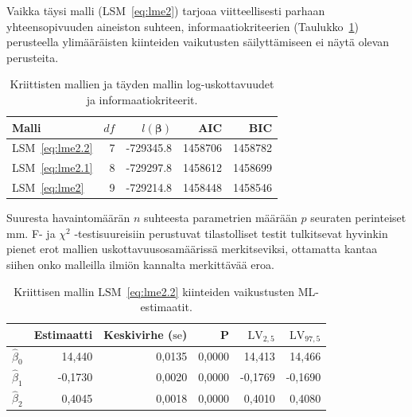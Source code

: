\documentclass[finnish]{docopts}
\begin{document}
Vaikka täysi malli (LSM~\ref{eq:lme2}) tarjoaa viitteellisesti parhaan yhteensopivuuden aineiston suhteen, informaatiokriteerien (Taulukko~\ref{table:kriittinen}) perusteella ylimääräisten kiinteiden vaikutusten säilyttämiseen ei näytä olevan perusteita.\\

\begin{table}[H]
\centering
\begin{tabular}{lrrrr}
\toprule
Malli & $df$ & $l(\bm{\beta})$ & AIC & BIC\\
\midrule
LSM~\ref{eq:lme2.2} & 7 & -729345.8 & 1458706 & 1458782\\
LSM~\ref{eq:lme2.1} & 8 & -729297.8 & 1458612 & 1458699\\
LSM~\ref{eq:lme2} & 9 & -729214.8 & 1458448 & 1458546\\
\bottomrule
\end{tabular}
\caption{Kriittisten mallien ja täyden mallin log-uskottavuudet ja informaatiokriteerit.}
\label{table:kriittinen}
\end{table}

Suuresta havaintomäärän $n$ suhteesta parametrien määrään $p$ seuraten perinteiset mm. F- ja $\chi^2$ -testisuureisiin perustuvat tilastolliset testit tulkitsevat hyvinkin pienet erot mallien uskottavuusosamäärissä merkitseviksi, ottamatta kantaa siihen onko malleilla ilmiön kannalta merkittävää eroa.\\

\begin{table}[H]
\centering
\begin{tabular}{lrrrrr}
\toprule
  & Estimaatti & Keskivirhe ($\text{se}$) & P & $\text{LV}_{2,5}$ & $\text{LV}_{97,5}$\\
\midrule
$\hat{\beta}_0$ & 14,440 & 0,0135 & 0,0000 & 14,413 & 14,466\\
$\hat{\beta}_1$ & -0,1730 & 0,0020 & 0,0000 & -0,1769 & -0,1690\\
$\hat{\beta}_2$ & 0,4045 & 0,0018 & 0,0000 & 0,4010 & 0,4080\\
\bottomrule
\end{tabular}
\caption{Kriittisen mallin $\text{LSM}$~\ref{eq:lme2.2} kiinteiden vaikustusten ML-estimaatit.}
\label{table:lme2.2}
\end{table}
\end{document}
